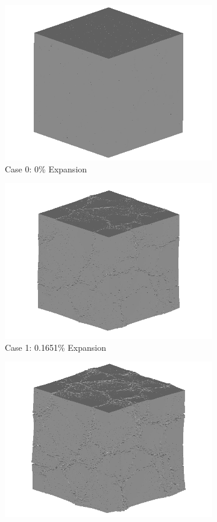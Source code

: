 \begin{figure}[!h]
\centering

    \begin{subfigure}{.5\textwidth}
      \centering
      \includegraphics[width=.8\linewidth]{Files/exp_3D/ASR/A30Undamaged.png} %
    \caption{Case 0: 0\% Expansion}
    \end{subfigure}%
    \begin{subfigure}{.5\textwidth}
      \centering
      \includegraphics[width=.8\linewidth]{Files/exp_3D/ASR/A30P25_1_3d.png}
    \caption{Case 1: 0.1651\% Expansion}
    \end{subfigure}
    \begin{subfigure}{.5\textwidth}
      \centering
      \includegraphics[width=.8\linewidth]{Files/exp_3D/ASR/A30P25_2_3d.png}

\end{subfigure}
\end{figure}

